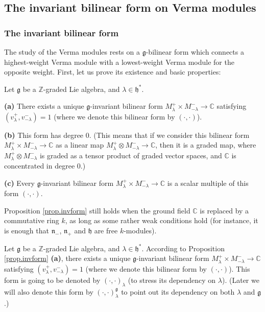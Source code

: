 \documentclass[etingof-lie.tex]{subfiles}
\begin{document}
\subsection{\label{subsect.invform}The invariant bilinear form on Verma
modules}

\subsubsection{The invariant bilinear form}

The study of the Verma modules rests on a $\mathfrak{g}$-bilinear form which
connects a highest-weight Verma module with a lowest-weight Verma module for
the opposite weight. First, let us prove its existence and basic properties:

\begin{proposition}
\label{prop.invform}Let $\mathfrak{g}$ be a $\mathbb{Z}$-graded Lie algebra,
and $\lambda\in\mathfrak{h}^{\ast}$.

\textbf{(a)} There exists a unique $\mathfrak{g}$-invariant bilinear form
$M_{\lambda}^{+}\times M_{-\lambda}^{-}\rightarrow\mathbb{C}$ satisfying
$\left(  v_{\lambda}^{+},v_{-\lambda}^{-}\right)  =1$ (where we denote this
bilinear form by $\left(  \cdot,\cdot\right)  $).

\textbf{(b)} This form has degree $0$. (This means that if we consider this
bilinear form $M_{\lambda}^{+}\times M_{-\lambda}^{-}\rightarrow\mathbb{C}$ as
a linear map $M_{\lambda}^{+}\otimes M_{-\lambda}^{-}\rightarrow\mathbb{C}$,
then it is a graded map, where $M_{\lambda}^{+}\otimes M_{-\lambda}^{-}$ is
graded as a tensor product of graded vector spaces, and $\mathbb{C}$ is
concentrated in degree $0$.)

\textbf{(c)} Every $\mathfrak{g}$-invariant bilinear form $M_{\lambda}%
^{+}\times M_{-\lambda}^{-}\rightarrow\mathbb{C}$ is a scalar multiple of this
form $\left(  \cdot,\cdot\right)  $.
\end{proposition}

\begin{remark}
\label{rmk.invform.1}Proposition \ref{prop.invform} still holds when the
ground field $\mathbb{C}$ is replaced by a commutative ring $k$, as long as
some rather weak conditions hold (for instance, it is enough that
$\mathfrak{n}_{-}$, $\mathfrak{n}_{+}$ and $\mathfrak{h}$ are free $k$-modules).
\end{remark}

\begin{definition}
\label{def.invform}Let $\mathfrak{g}$ be a $\mathbb{Z}$-graded Lie algebra,
and $\lambda\in\mathfrak{h}^{\ast}$. According to Proposition
\ref{prop.invform} \textbf{(a)}, there exists a unique $\mathfrak{g}%
$-invariant bilinear form $M_{\lambda}^{+}\times M_{-\lambda}^{-}%
\rightarrow\mathbb{C}$ satisfying $\left(  v_{\lambda}^{+},v_{-\lambda}%
^{-}\right)  =1$ (where we denote this bilinear form by $\left(  \cdot
,\cdot\right)  $). This form is going to be denoted by $\left(  \cdot
,\cdot\right)  _{\lambda}$ (to stress its dependency on $\lambda$). (Later we
will also denote this form by $\left(  \cdot,\cdot\right)  _{\lambda
}^{\mathfrak{g}}$ to point out its dependency on both $\lambda$ and
$\mathfrak{g}$.)
\end{definition}
\end{document}
